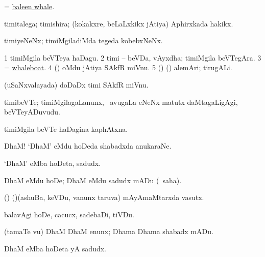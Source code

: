 \bentry
{} 
\gl{\nA}
\expl{}
\bmng
= \hyperref{kandict_b.pdf}{B}{baleen whale}{baleen whale}. 
\emng
\eentry

\bentry
{} 
\gl{\nA}
\expl{}
\bmng
timitalega; timishira; (kokakxre, beLaLxkikx jAtiya) Aphirxkada hakikx. 
\emng
\eentry

\bentry
{} 
\gl{\nA}
\expl{}
\bmng
timiyeNeNx; timiMgiladiMda tegeda kobebxNeNx. 
\emng
\eentry

\bentry
{} 
\gl{\nA}
\expl{}
\bmng
\bnum
\num{1} timiMgila beVTeya haDagu. 
\num{2} timi -- beVDa, vAyxdha; timiMgila beVTegAra. 
\num{3} = \hyperlink{whaleboat}{whaleboat}. 
\num{4} (\AseTxrXV) oMdu jAtiya SAkfR miVnu. 
\num{5} (\AseTxrXV) (\ashi) alemAri; tirugALi. 
\enum
\emng
\eentry

\bentry
{} 
\gl{\nA}
\expl{}
\bmng
(uSaNxvalayada) doDaDx timi SAkfR miVnu. 
\emng
\eentry

\bentry
{} 
\gl{\nA}
\expl{}
\bmng
timibeVTe; timiMgilagaLanunx, \kanmu\ avugaLa eNeNx matutx daMtagaLigAgi, beVTeyADuvudu. 
\emng
\eentry

\bentry
{} 
\gl{\nA}
\expl{}
\bmng
timiMgila beVTe haDagina kaphAtxna. 
\emng
\eentry

\bentry
{} 
\gl{\BAavayx}
\expl{}
\bmng
DhaM! `DhaM' eMdu hoDeda shabadxda anukaraNe. 
\emng
\eentry

\bentry
{}
\gl{\nA}
\expl{}
\bmng
`DhaM' eMba hoDeta, sadudx. 
\emng
\eentry

\bentry
{}
\gl{\sakirx}
\bmng
DhaM eMdu hoDe; DhaM eMdu sadudx mADu (\akirx\ saha). 
\emng
\eentry

\bentry
{} 
\gl{\nA}
\bmng
(\ame) (\AmA)(ashuBa, keVDu, \mo vanunx taruva) mAyAmaMtarxda vasutx. 
\emng
\eentry

\bentry
{} 
\gl{\sakirx}
\expl{}
\bmng
balavAgi hoDe, cacucx, sadebaDi, tiVDu. 
\emng

\noindent 
\gl{\akirx}
\expl{}
\bmng
(tamaTe \mo vu) DhaM DhaM enunx; Dhama Dhama shabadx mADu. 
\emng
\eentry

\bentry
{} 
\gl{\nA}
\expl{}
\bmng
DhaM eMba hoDeta yA sadudx. 
\emng
\eentry

